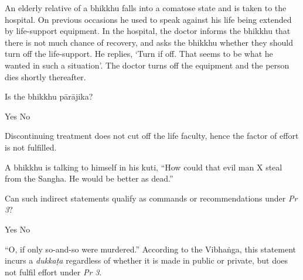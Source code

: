 \begin{exam}{\autoExamName}
\begin{problem}
\end{problem}

\problemDivide

\begin{problem}

  An elderly relative of a bhikkhu falls into a comatose state and is taken to the hospital.
  On previous occasions he used to speak against his life being extended by life-support equipment.
  In the hospital, the doctor informs the bhikkhu that there is not much chance of recovery, and asks the bhikkhu whether they should turn off the life-support.
  He replies, `Turn if off. That seems to be what he wanted in such a situation'.
  The doctor turns off the equipment and the person dies shortly thereafter.

  \bigskip

  Is the bhikkhu pārājika?

  \begin{answers}{2}
    \bChoices
     Yes\eAns
     No\eAns
    \eChoices
  \end{answers}

  \begin{solution}
    Discontinuing treatment does not cut off the life faculty, hence the factor of effort is not fulfilled.
  \end{solution}

\end{problem}

\problemDivide

\begin{problem}

  A bhikkhu is talking to himself in his kuti, ``How could that evil man X steal from the Sangha. He would be better as dead.''

  Can such indirect statements qualify as commands or recommendations under \emph{Pr 3}?

  \bigskip

  \begin{answers}{2}
    \bChoices
     Yes\eAns
     No\eAns
    \eChoices
  \end{answers}

  \begin{solution}
    ``O, if only so-and-so were murdered.'' According to the Vibhaṅga, this statement incurs a \emph{dukkaṭa} regardless of whether it is made in public or private, but does not fulfil effort under \emph{Pr 3}.
  \end{solution}


\end{problem}
\end{exam}
